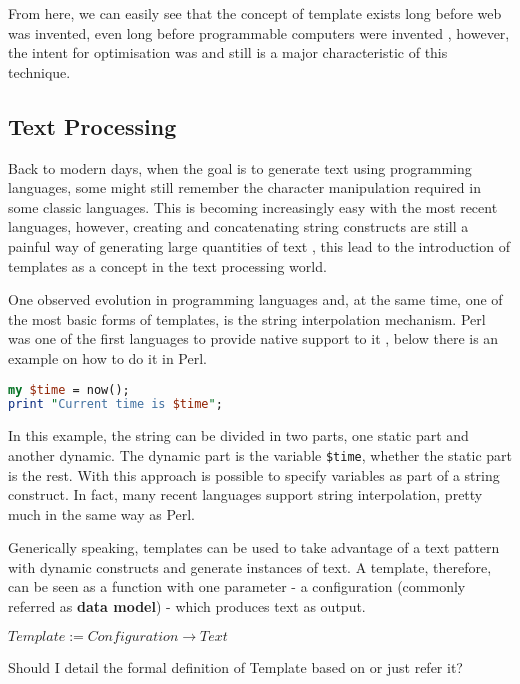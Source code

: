 From here, we can easily see that the concept of template exists long before web was invented, even long before programmable computers were invented \cite{Clements2014ComputerVariations}, however, the intent for optimisation was and still is a major characteristic of this technique.

\subsection{Text Processing}

Back to modern days, when the goal is to generate text using programming languages, some might still remember the character manipulation required in some classic languages. This is becoming increasingly easy with the most recent languages, however, creating and concatenating string constructs are still a painful way of generating large quantities of text \cite{Fowler2003PatternsArchitecture}, this lead to the introduction of templates as a concept in the text processing world.

One observed evolution in programming languages and, at the same time, one of the most basic forms of templates, is the string interpolation mechanism. Perl was one of the first languages to provide native support to it \cite{Wall2000ProgrammingPerl}, below there is an example on how to do it in Perl.

\begin{lstlisting}[language=Perl]
my $time = now();
print "Current time is $time";
\end{lstlisting}

In this example, the string can be divided in two parts, one static part and another dynamic. The dynamic part is the variable \texttt{\$time}, whether the static part is the rest. With this approach is possible to specify variables as part of a string construct. In fact, many recent languages support string interpolation, pretty much in the same way as Perl. 

Generically speaking, templates can be used to take advantage of a text pattern with dynamic constructs and generate instances of text. A template, therefore, can be seen as a function with one parameter - a configuration (commonly referred as \textbf{data model}) - which produces text as output. 

\begin{center}
$Template := Configuration \rightarrow Text$
\end{center}

\begin{orientador}
    Should I detail the formal definition of Template based on \cite{Parr2004EnforcingEngines} or just refer it?
\end{orientador}

